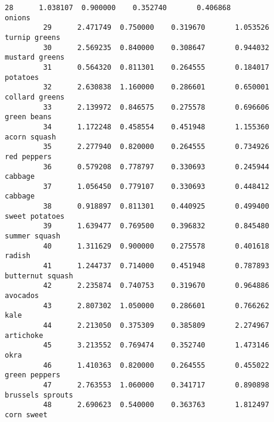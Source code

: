\documentclass[11pt]{article}
\begin{document}
\begin{Verbatim}[commandchars=\\\{\}]
         28      1.038107  0.900000    0.352740       0.406868            onions   
         29      2.471749  0.750000    0.319670       1.053526     turnip greens   
         30      2.569235  0.840000    0.308647       0.944032    mustard greens   
         31      0.564320  0.811301    0.264555       0.184017          potatoes   
         32      2.630838  1.160000    0.286601       0.650001    collard greens   
         33      2.139972  0.846575    0.275578       0.696606       green beans   
         34      1.172248  0.458554    0.451948       1.155360      acorn squash   
         35      2.277940  0.820000    0.264555       0.734926       red peppers   
         36      0.579208  0.778797    0.330693       0.245944           cabbage   
         37      1.056450  0.779107    0.330693       0.448412           cabbage   
         38      0.918897  0.811301    0.440925       0.499400    sweet potatoes   
         39      1.639477  0.769500    0.396832       0.845480     summer squash   
         40      1.311629  0.900000    0.275578       0.401618            radish   
         41      1.244737  0.714000    0.451948       0.787893  butternut squash   
         42      2.235874  0.740753    0.319670       0.964886          avocados   
         43      2.807302  1.050000    0.286601       0.766262              kale   
         44      2.213050  0.375309    0.385809       2.274967         artichoke   
         45      3.213552  0.769474    0.352740       1.473146              okra   
         46      1.410363  0.820000    0.264555       0.455022     green peppers   
         47      2.763553  1.060000    0.341717       0.890898  brussels sprouts   
         48      2.690623  0.540000    0.363763       1.812497        corn sweet   
         

\end{Verbatim}
\end{document}
